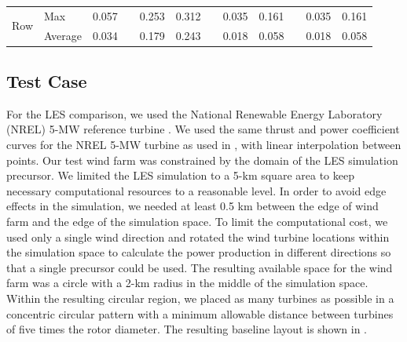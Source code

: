 \documentclass[conf]{new-aiaa}
\begin{document}
\begin{table}[htpb!]
\begin{tabular}{@{}llrcrrcrrcrr@{}}


\multicolumn{1}{c|}{\multirow{2}{*}{Row}} &  \multicolumn{1}{l}{Max} & 0.057 & & 0.253 & 0.312 & & 0.035 & 0.161 & & 0.035 & 0.161\\
\multicolumn{1}{c|}{} &  \multicolumn{1}{l}{Average} & 0.034 & & 0.179 &0.243 & & 0.018 & 0.058 & & 0.018 & 0.058 \\

 \bottomrule
\end{tabular}

\end{table}

\subsection{Test Case}\label{sec:testcase}

For the LES comparison, we used the National Renewable Energy Laboratory (NREL) 5-MW reference turbine \cite{jonkman2009definition}. We used the same thrust and power coefficient curves for the NREL 5-MW turbine as used in \cite{gebraad2017-max-aep}, with linear interpolation between points. Our test wind farm was constrained by the domain of the LES simulation precursor. We limited the LES simulation to a 5-km square area to keep necessary computational resources to a reasonable level. In order to avoid edge effects in the simulation, we needed at least 0.5 km between the edge of wind farm and the edge of the simulation space. To limit the computational cost, we used only a single wind direction and rotated the wind turbine locations within the simulation space to calculate the power production in different directions so that a single precursor could be used. The resulting available space for the wind farm was a circle with a 2-km radius in the middle of the simulation space. Within the resulting circular region, we placed as many turbines as possible in a concentric circular pattern with a minimum allowable distance between turbines of five times the rotor diameter. The resulting baseline layout is shown in .    
\end{document}
